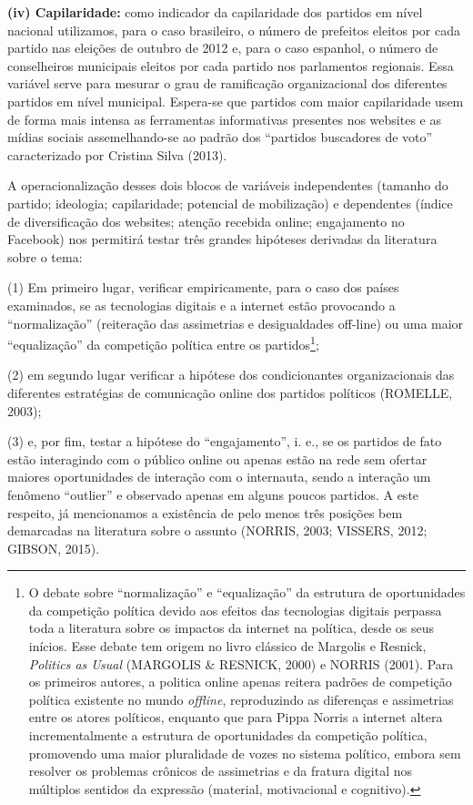 \textbf{(iv) Capilaridade:} como indicador da capilaridade dos partidos
em nível nacional utilizamos, para o caso brasileiro, o número de
prefeitos eleitos por cada partido nas eleições de outubro de 2012 e,
para o caso espanhol, o número de conselheiros municipais eleitos por
cada partido nos parlamentos regionais. Essa variável serve para mesurar
o grau de ramificação organizacional dos diferentes partidos em nível
municipal. Espera-se que partidos com maior capilaridade usem de forma
mais intensa as ferramentas informativas presentes nos websites e as
mídias sociais assemelhando-se ao padrão dos ``partidos buscadores de
voto'' caracterizado por Cristina Silva (2013).

A operacionalização desses dois blocos de variáveis independentes
(tamanho do partido; ideologia; capilaridade; potencial de mobilização)
e dependentes (índice de diversificação dos websites; atenção recebida
online; engajamento no Facebook) nos permitirá testar três grandes
hipóteses derivadas da literatura sobre o tema:

(1) Em primeiro lugar, verificar empiricamente, para o caso dos países
examinados, se as tecnologias digitais e a internet estão provocando a
``normalização'' (reiteração das assimetrias e desigualdades off-line)
ou uma maior ``equalização'' da competição política entre os
partidos\footnote{O debate sobre ``normalização'' e ``equalização'' da
  estrutura de oportunidades da competição política devido aos efeitos
  das tecnologias digitais perpassa toda a literatura sobre os impactos
  da internet na política, desde os seus inícios. Esse debate tem origem
  no livro clássico de Margolis e Resnick, \emph{Politics as Usual}
  (MARGOLIS \& RESNICK, 2000) e NORRIS (2001). Para os primeiros
  autores, a politica online apenas reitera padrões de competição
  política existente no mundo \emph{offline}, reproduzindo as diferenças
  e assimetrias entre os atores políticos, enquanto que para Pippa
  Norris a internet altera incrementalmente a estrutura de oportunidades
  da competição política, promovendo uma maior pluralidade de vozes no
  sistema político, embora sem resolver os problemas crônicos de
  assimetrias e da fratura digital nos múltiplos sentidos da expressão
  (material, motivacional e cognitivo).};

(2) em segundo lugar verificar a hipótese dos condicionantes
organizacionais das diferentes estratégias de comunicação online dos
partidos políticos (ROMELLE, 2003);

(3) e, por fim, testar a hipótese do ``engajamento'', i. e., se os
partidos de fato estão interagindo com o público online ou apenas estão
na rede sem ofertar maiores oportunidades de interação com o internauta,
sendo a interação um fenômeno ``outlier'' e observado apenas em alguns
poucos partidos. A este respeito, já mencionamos a existência de pelo
menos três posições bem demarcadas na literatura sobre o assunto
(NORRIS, 2003; VISSERS, 2012; GIBSON, 2015).

